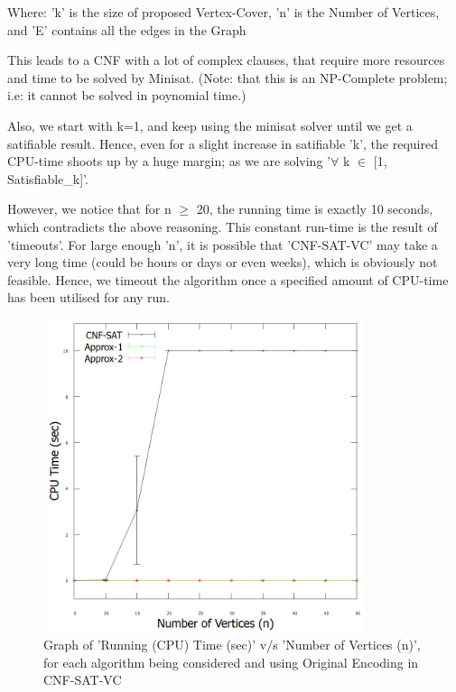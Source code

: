 \documentclass[11pt]{llncs}
\begin{document}
		Where: 'k' is the size of proposed Vertex-Cover, 
			  'n' is the Number of Vertices, 
			  and 'E' contains all the edges in the Graph

		This leads to a CNF with a lot of complex clauses, that require more resources and time to be solved by Minisat. (Note: that this is an NP-Complete problem; i.e: it cannot be solved in poynomial time.)

		Also, we start with k=1, and keep using the minisat solver until we get a satifiable result. Hence, even for a slight increase in satifiable 'k', the required CPU-time shoots up by a huge margin; as we are solving '$\forall$ k $\in$ [1, Satisfiable\_k]'.

		However, we notice that for n $\geq$ 20, the running time is exactly 10 seconds, which contradicts the above reasoning. This constant run-time is the result of 'timeouts'.
		For large enough 'n', it is possible that 'CNF-SAT-VC' may take a very long time (could be hours or days or even weeks), which is obviously not feasible. Hence, we timeout the algorithm once a specified amount of CPU-time has been utilised for any run.\\

		\begin{figure}[H]
			\includegraphics[width=0.84\textwidth]{original_time_vs_n.png}
			\caption{Graph of 'Running (CPU) Time (sec)' v/s 'Number of Vertices (n)', for each algorithm being considered and using Original Encoding \cite{a4_pdf} in CNF-SAT-VC} \label{fig1}
		\end{figure}
\end{document}
